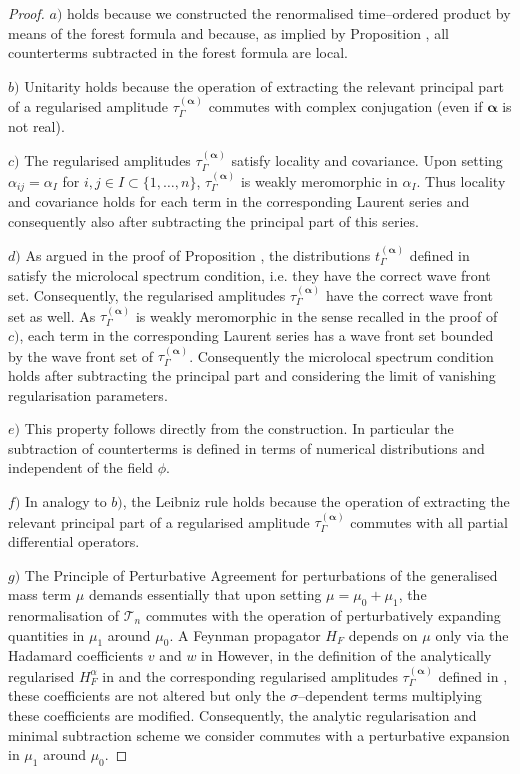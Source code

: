 \documentclass[10pt]{book}
\theoremstyle{break}
\begin{document}
\begin{proof}
$a)$ holds because we constructed the renormalised time--ordered product by means of the forest formula %
and because, as implied by Proposition %
, all counterterms subtracted in the forest formula are local.

$b)$ Unitarity holds because the operation of extracting the relevant principal part of a regularised amplitude $\tau^{(\boldsymbol{\alpha})}_\Gamma$ commutes with complex conjugation (even if $\boldsymbol{\alpha}$ is not real).

$c)$ The regularised amplitudes $\tau^{(\boldsymbol{\alpha})}_\Gamma$ satisfy locality and covariance. Upon setting $\alpha_{ij}=\alpha_I$ for $i,j\in I\subset \{1,\dots,n\}$, $\tau^{(\boldsymbol{\alpha})}_\Gamma$ is weakly meromorphic in $\alpha_I$. Thus locality and covariance holds for each term in the corresponding Laurent series and consequently also after subtracting the principal part of this series.

$d)$ As argued in the proof of Proposition%
, the distributions $t^{(\boldsymbol{\alpha})}_\Gamma$ defined in %
satisfy the microlocal spectrum condition, i.e. they have the correct wave front set. Consequently, the regularised amplitudes $\tau^{(\boldsymbol{\alpha})}_\Gamma$ have the correct wave front set as well. As $\tau^{(\boldsymbol{\alpha})}_\Gamma$ is weakly meromorphic in the sense recalled in the proof of $c)$, each term in the corresponding Laurent series has a wave front set bounded by the wave front set of $\tau^{(\boldsymbol{\alpha})}_\Gamma$. Consequently the microlocal spectrum condition holds after subtracting the principal part and considering the limit of vanishing regularisation parameters.

$e)$ This property follows directly from the construction. In particular the subtraction of counterterms is defined in terms of numerical distributions and independent of the field $\phi$.

$f)$ In analogy to $b)$, the Leibniz rule holds because the operation of extracting the relevant principal part of a regularised amplitude $\tau^{(\boldsymbol{\alpha})}_\Gamma$ commutes with all partial differential operators.

$g)$ The Principle of Perturbative Agreement for perturbations of the generalised mass term $\mu$ demands essentially that upon setting $\mu=\mu_0 + \mu_1$, the renormalisation of $\mathcal{T}_n$ commutes with the operation of perturbatively expanding quantities in $\mu_1$ around $\mu_0$. A Feynman propagator $H_F$ depends on $\mu$ only via the Hadamard coefficients $v$ and $w$ in %
However, in the definition of the analytically regularised $H^{\alpha}_F$ in %
and the corresponding regularised amplitudes $\tau^{(\boldsymbol{\alpha})}_\Gamma$ defined in %
, these coefficients are not altered but only the $\sigma$--dependent terms multiplying these coefficients are modified. Consequently, the analytic regularisation and minimal subtraction scheme we consider commutes with a perturbative expansion in $\mu_1$ around $\mu_0$.


\end{proof}
\end{document}
